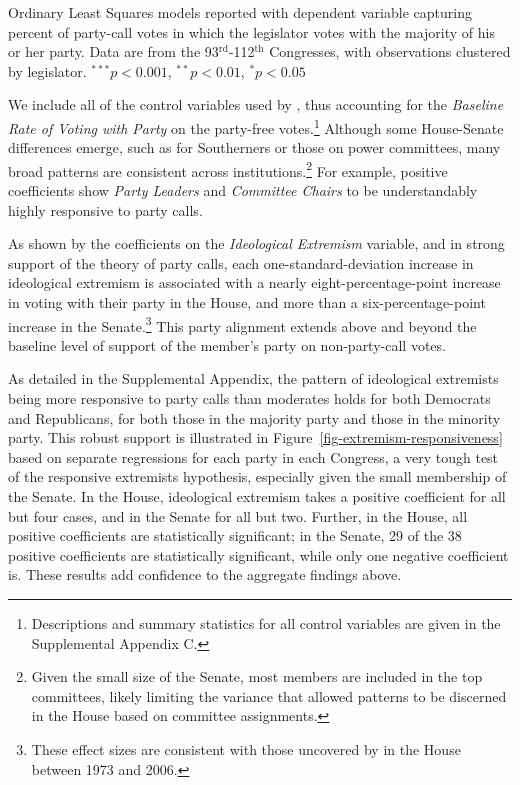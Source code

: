 \documentclass[12pt]{article}
\begin{document}
\begin{table}[!htbp]
\begin{threeparttable}
\begin{tablenotes}
   \item
   Ordinary Least Squares models reported with dependent variable capturing percent of party-call votes in which the legislator votes with the majority of his or her party. Data are from the 93$^{\text{rd}}$-112$^{\text{th}}$ Congresses, with observations clustered by legislator.
   $^{***}p<0.001$, $^{**}p<0.01$, $^*p<0.05$
 \end{tablenotes}
\end{threeparttable}
\end{table}

We include all of the control variables used by \cite{Minozzi:2013}, thus accounting for the \textit{Baseline Rate of Voting with Party} on the party-free votes.\footnote{\doublespacing\normalsize Descriptions and summary statistics for all control variables are given in the Supplemental Appendix C.} Although some House-Senate differences emerge, such as for Southerners or those on power committees, many broad patterns are consistent across institutions.\footnote{\doublespacing\normalsize Given the small size of the Senate, most members are included in the top committees, likely limiting the variance that allowed patterns to be discerned in the House based on committee assignments.} For example, positive coefficients show \textit{Party Leaders} and \textit{Committee Chairs} to be understandably highly responsive to party calls.

As shown by the coefficients on the \textit{Ideological Extremism} variable, and in strong support of the theory of party calls, each one-standard-deviation increase in ideological extremism is associated with a nearly eight-percentage-point increase in voting with their party in the House, and more than a six-percentage-point increase in the Senate.\footnote{\doublespacing\normalsize These effect sizes are consistent with those uncovered by \cite{Minozzi:2013} in the House between 1973 and 2006.} This party alignment extends above and beyond the baseline level of support of the member's party on non-party-call votes.

As detailed in the Supplemental Appendix, the pattern of ideological extremists being more responsive to party calls than moderates holds for both Democrats and Republicans, for both those in the majority party and those in the minority party. This robust support is illustrated in Figure~\ref{fig-extremism-responsiveness} based on separate regressions for each party in each Congress, a very tough test of the responsive extremists hypothesis, especially given the small membership of the Senate. In the House, ideological extremism takes a positive coefficient for all but four cases, and in the Senate for all but two. Further, in the House, all positive coefficients are statistically significant; in the Senate, 29 of the 38 positive coefficients are statistically significant, while only one negative coefficient is. These results add confidence to the aggregate findings above.
\end{document}
